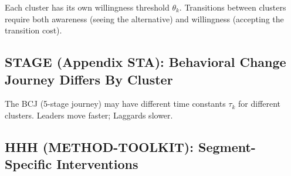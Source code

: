 Each cluster has its own willingness threshold $\theta_k$. Transitions between
clusters require both awareness (seeing the alternative) and willingness
(accepting the transition cost).

\subsection{STAGE (Appendix STA): Behavioral Change Journey Differs By Cluster}

The BCJ (5-stage journey) may have different time constants $\tau_k$ for
different clusters. Leaders move faster; Laggards slower.

\subsection{HHH (METHOD-TOOLKIT): Segment-Specific Interventions}
\label{sec:ba-hhh-integration}

